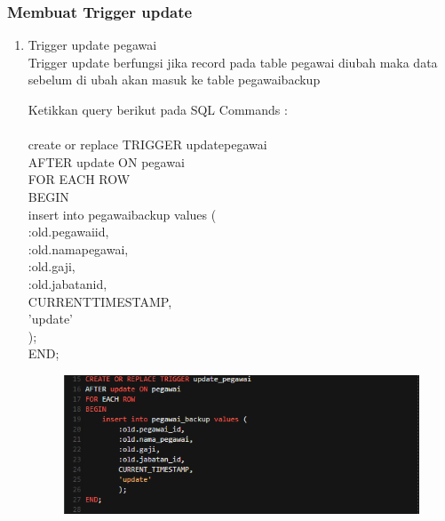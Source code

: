 \documentclass[12pt, times new roman, a4paper]{report}
\begin{document}
\subsubsection{Membuat Trigger update}
\begin{enumerate}
\item Trigger update pegawai\\
Trigger update berfungsi jika record pada table pegawai diubah maka data sebelum di ubah akan masuk ke table pegawai\textunderscore backup\\
\par Ketikkan query berikut pada SQL Commands :\\
\\
create or replace TRIGGER update\textunderscore pegawai\\
AFTER update ON pegawai\\
FOR EACH ROW\\
BEGIN\\
    insert into pegawai\textunderscore backup values (\\
        :old.pegawai\textunderscore id,\\
        :old.nama\textunderscore pegawai,\\
        :old.gaji,\\
        :old.jabatan\textunderscore id,\\
        CURRENT\textunderscore TIMESTAMP,\\
        'update'\\
        );\\
END;
\begin{figure}[h]
	\centering
		\includegraphics[scale=0.7]{gambar/13}
\end{figure}


\end{enumerate}
\end{document}
